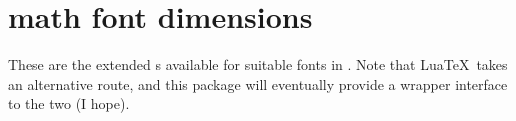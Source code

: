 
\section{ math font dimensions}

These are the extended \cmd\fontdimen s available for suitable fonts
in \XeTeX. Note that Lua\TeX\ takes an alternative route, and this package
will eventually provide a wrapper interface to the two (I hope).

\setcounter{mfdimen}{9}
\newcommand\mathfontdimen[2]{^^A
  \stepcounter{mfdimen}^^A
  \themfdimen & {\scshape\small #1} & #2\vspace{0.5ex} \tabularnewline}

